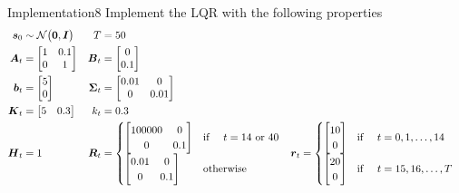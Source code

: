\begin{questions}


\begin{question}{Implementation}{8}
	Implement the LQR with the following properties
	\begin{align*}
	{\boldsymbol{s}}_0 & \sim \mathcal{N}\big({\boldsymbol{0}},{\boldsymbol{I}}\big) &	T &= 50
	\\
	{\boldsymbol{A}}_t &= \begin{bmatrix}
       1 & 0.1\\
       0 & 1
    \end{bmatrix} &
	{\boldsymbol{B}}_t &= \begin{bmatrix}
       0 \\
       0.1
    \end{bmatrix}
    \\
	{\boldsymbol{b}}_t &= \begin{bmatrix}
       5\\
       0
    \end{bmatrix} & {\boldsymbol{\Sigma}}_t &= \begin{bmatrix}
       0.01 & 0\\
       0 & 0.01
    \end{bmatrix}
	\\
	{\boldsymbol{K}}_t &= \begin{bmatrix}
       5 &
       0.3
    \end{bmatrix} & 
	k_t &= 0.3 & 
	\\
	{\boldsymbol{H}}_t &= 1 & 		
	{\boldsymbol{R}}_t &= \begin{cases}
	\begin{bmatrix}
	100000 &0\\
	0&0.1
	\end{bmatrix}  & \text{if \quad $t=14$ or 40}
	\\
	\begin{bmatrix}
	0.01 &0\\
	0&0.1
	\end{bmatrix} & \text{otherwise}
	\end{cases}	
	&
	{\boldsymbol{r}}_t &= \begin{cases}
	\begin{bmatrix}
	10\\
	0
	\end{bmatrix}  & \text{if \quad} t=0,1,\ldots,14
	\\
	\begin{bmatrix}
	20\\
	0
	\end{bmatrix}  & \text{if \quad} t=15,16,\ldots,T
	\end{cases}	
	\end{align*}
	

\end{question}
\end{questions}

